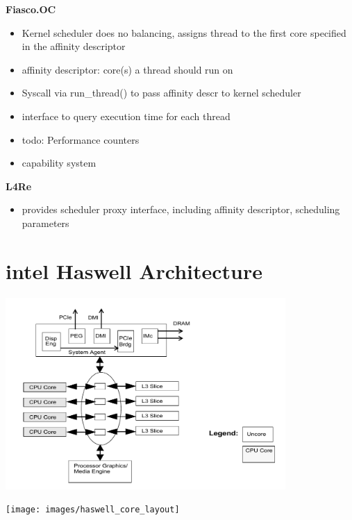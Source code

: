 \textbf{Fiasco.OC}
\begin{itemize}
  \item Kernel scheduler does no balancing, assigns thread to the first
    core specified in the affinity descriptor
  \item affinity descriptor: core(s) a thread should run on
  \item Syscall via run\_thread() to pass affinity descr to kernel scheduler
  \item interface to query execution time for each thread 
  \item	todo: Performance counters
  \item capability system
\end{itemize}

\textbf{L4Re}
\begin{itemize}
  \item provides scheduler proxy interface, including affinity descriptor,
    scheduling parameters
\end{itemize}



\section{\gls{intel} Haswell Architecture}
\label{state:haswell}

\includegraphics[width=0.8\textwidth]{images/haswell_architecture_by_intel_large}

\texttt{[image: images/haswell\_core\_layout]}


